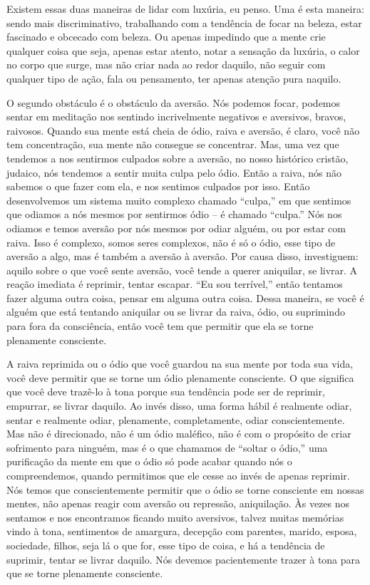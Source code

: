 Existem essas duas maneiras de lidar com luxúria, eu penso. Uma é
esta maneira: sendo mais discriminativo, trabalhando com a tendência de
focar na beleza, estar fascinado e obcecado com beleza. Ou apenas
impedindo que a mente crie qualquer coisa que seja, apenas estar
atento, notar a sensação da luxúria, o calor no corpo que surge, mas
não criar nada ao redor daquilo, não seguir com qualquer tipo de ação,
fala ou pensamento, ter apenas atenção pura naquilo.

O segundo obstáculo é o obstáculo da aversão. Nós podemos focar,
podemos sentar em meditação nos sentindo incrivelmente negativos e
aversivos, bravos, raivosos. Quando sua mente está cheia de ódio, raiva
e aversão, é claro, você não tem concentração, sua mente não consegue
se concentrar. Mas, uma vez que tendemos a nos sentirmos culpados sobre
a aversão, no nosso histórico cristão, judaico, nós tendemos a sentir
muita culpa pelo ódio. Então a raiva, nós não sabemos o que fazer com
ela, e nos sentimos culpados por isso. Então desenvolvemos um sistema
muito complexo chamado “culpa,” em que sentimos que odiamos a nós
mesmos por sentirmos ódio – é chamado “culpa.” Nós nos odiamos e temos
aversão por nós mesmos por odiar alguém, ou por estar com raiva. Isso é
complexo, somos seres complexos, não é só o ódio, esse tipo de aversão
a algo, mas é também a aversão à aversão. Por causa disso, investiguem:
aquilo sobre o que você sente aversão, você tende a querer aniquilar,
se livrar. A reação imediata é reprimir, tentar escapar. “Eu sou
terrível,” então tentamos fazer alguma outra coisa, pensar em alguma
outra coisa. Dessa maneira, se você é alguém que está tentando
aniquilar ou se livrar da raiva, ódio, ou suprimindo para fora da
consciência, então você tem que permitir que ela se torne plenamente
consciente.

A raiva reprimida ou o ódio que você guardou na sua mente por toda
sua vida, você deve permitir que se torne um ódio plenamente
consciente. O que significa que você deve trazê-lo à tona porque sua
tendência pode ser de reprimir, empurrar, se livrar daquilo. Ao invés
disso, uma forma hábil é realmente odiar, sentar e realmente odiar,
plenamente, completamente, odiar conscientemente. Mas não é
direcionado, não é um ódio maléfico, não é com o propósito de criar
sofrimento para ninguém, mas é o que chamamos de “soltar o ódio,” uma
purificação da mente em que o ódio só pode acabar quando nós o
compreendemos, quando permitimos que ele cesse ao invés de apenas
reprimir. Nós temos que conscientemente permitir que o ódio se torne
consciente em nossas mentes, não apenas reagir com aversão ou
repressão, aniquilação. Às vezes nos sentamos e nos encontramos ficando
muito aversivos, talvez muitas memórias vindo à tona, sentimentos de
amargura, decepção com parentes, marido, esposa, sociedade, filhos,
seja lá o que for, esse tipo de coisa, e há a tendência de suprimir,
tentar se livrar daquilo. Nós devemos pacientemente trazer à tona para
que se torne plenamente consciente. 


